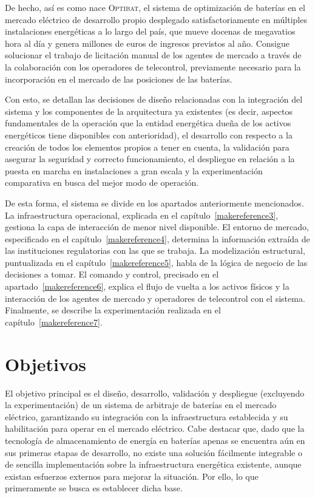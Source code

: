 De hecho, así es como nace \textsc{Optibat}, el sistema de optimización de baterías en el mercado eléctrico de desarrollo propio desplegado satisfactoriamente en múltiples instalaciones energéticas a lo largo del país, que mueve docenas de megavatios hora al día y genera millones de euros de ingresos previstos al año. Consigue solucionar el trabajo de licitación manual de los agentes de mercado a través de la colaboración con los operadores de telecontrol, previamente necesario para la incorporación en el mercado de las posiciones de las baterías.

Con esto, se detallan las decisiones de diseño relacionadas con la integración del sistema y los componentes de la arquitectura ya existentes (es decir, aspectos fundamentales de la operación que la entidad energética dueña de los activos energéticos tiene disponibles con anterioridad), el desarrollo con respecto a la creación de todos los elementos propios a tener en cuenta, la validación para asegurar la seguridad y correcto funcionamiento, el despliegue en relación a la puesta en marcha en instalaciones a gran escala y la experimentación comparativa en busca del mejor modo de operación.

De esta forma, el sistema se divide en los apartados anteriormente mencionados. La infraestructura operacional, explicada en el capítulo~\ref{makereference3}, gestiona la capa de interacción de menor nivel disponible. El entorno de mercado, especificado en el capítulo~\ref{makereference4}, determina la información extraída de las instituciones regulatorias con las que se trabaja. La modelización estructural, puntualizada en el capítulo~\ref{makereference5}, habla de la lógica de negocio de las decisiones a tomar. El comando y control, precisado en el apartado~\ref{makereference6}, explica el flujo de vuelta a los activos físicos y la interacción de los agentes de mercado y operadores de telecontrol con el sistema. Finalmente, se describe la experimentación realizada en el capítulo~\ref{makereference7}.

\section{Objetivos}
\label{makereference1.1}

El objetivo principal es el diseño, desarrollo, validación y despliegue (excluyendo la experimentación) de un sistema de arbitraje de baterías en el mercado eléctrico, garantizando su integración con la infraestructura establecida y su habilitación para operar en el mercado eléctrico. Cabe destacar que, dado que la tecnología de almacenamiento de energía en baterías apenas se encuentra aún en sus primeras etapas de desarrollo, no existe una solución fácilmente integrable o de sencilla implementación sobre la infraestructura energética existente, aunque existan esfuerzos externos para mejorar la situación. Por ello, lo que primeramente se busca es establecer dicha base.

